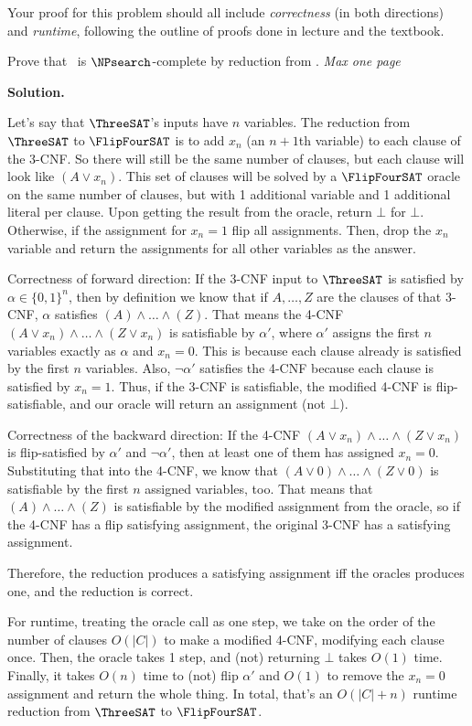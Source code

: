 \documentclass[11pt]{article}
\newenvironment{soln}{%
  \par\medskip\noindent\begingroup\color{blue}\textbf{Solution.}\ %
}{%
  \endgroup\par\medskip%
}
\begin{document}
\begin{enumerate}
        Your proof for this problem should all include \textit{correctness} (in both directions) and \textit{runtime}, following the outline of proofs done in lecture and the textbook.  

Prove that \FlipFourSAT\ is $\NPsearch$-complete by reduction from \ThreeSAT.  \textit{Max one page}

\begin{soln}
Let's say that $\ThreeSAT$'s inputs have $n$ variables. The reduction from $\ThreeSAT$ to $\FlipFourSAT$ is to add $x_n$ (an $n+1$th variable) to each clause of the 3-CNF. So there will still be the same number of clauses, but each clause will look like $(A\vee x_n)$. This set of clauses will be solved by a $\FlipFourSAT$ oracle on the same number of clauses, but with 1 additional variable and 1 additional literal per clause. Upon getting the result from the oracle, return $\bot$ for $\bot$. Otherwise, if the assignment for $x_n=1$ flip all assignments. Then, drop the $x_n$ variable and return the assignments for all other variables as the answer.

Correctness of forward direction: If the 3-CNF input to $\ThreeSAT$ is satisfied by $\alpha\in\{0,1\}^n$, then by definition we know that if $A,\ldots,Z$ are the clauses of that 3-CNF, $\alpha$ satisfies $(A)\land\ldots\land(Z)$. That means the 4-CNF $(A\vee x_n)\land\ldots\land(Z\vee x_n)$ is satisfiable by $\alpha'$, where $\alpha'$ assigns the first $n$ variables exactly as $\alpha$ and $x_n=0$. This is because each clause already is satisfied by the first $n$ variables. Also, $\neg\alpha'$ satisfies the 4-CNF because each clause is satisfied by $x_n=1$. Thus, if the 3-CNF is satisfiable, the modified 4-CNF is flip-satisfiable, and our oracle will return an assignment (not $\bot$).

Correctness of the backward direction: If the 4-CNF $(A\vee x_n)\land\ldots\land(Z\vee x_n)$ is flip-satisfied by $\alpha'$ and $\neg\alpha'$, then at least one of them has assigned $x_n=0$. Substituting that into the 4-CNF, we know that $(A\vee0)\land\ldots\land(Z\vee0)$ is satisfiable by the first $n$ assigned variables, too. That means that $(A)\land\ldots\land(Z)$ is satisfiable by the modified assignment from the oracle, so if the 4-CNF has a flip satisfying assignment, the original 3-CNF has a satisfying assignment.

Therefore, the reduction produces a satisfying assignment iff the oracles produces one, and the reduction is correct.

For runtime, treating the oracle call as one step, we take on the order of the number of clauses $O(|C|)$ to make a modified 4-CNF, modifying each clause once. Then, the oracle takes 1 step, and (not) returning $\bot$ takes $O(1)$ time. Finally, it takes $O(n)$ time to (not) flip $\alpha'$ and $O(1)$ to remove the $x_n=0$ assignment and return the whole thing. In total, that's an $O(|C|+n)$ runtime reduction from $\ThreeSAT$ to $\FlipFourSAT$.


\end{soln}
\end{enumerate}
\end{document}
